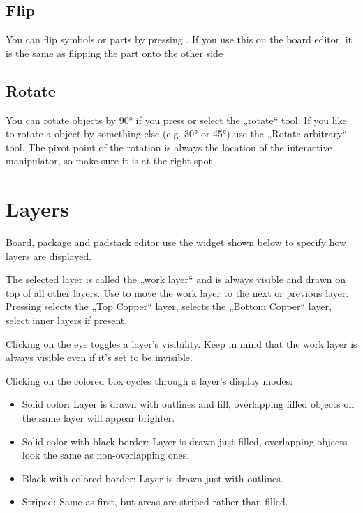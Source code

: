 \documentclass[letterpaper,10pt,czech]{sphinxmanual}
\begin{document}
\section{Flip}
\label{\detokenize{move:flip}}
You can flip symbols or parts by pressing . If you use this on the board editor, it is the same as flipping the part onto the other side


\section{Rotate}
\label{\detokenize{move:rotate}}
You can rotate objects by 90° if you press  or select the „rotate“ tool. If you like to rotate a object by something else (e.g. 30° or 45°) use the „Rotate arbitrary“ tool. The pivot point of the rotation is always the location of the interactive manipulator, so make sure it is at the right spot


\chapter{Layers}
\label{\detokenize{layers:layers}}\label{\detokenize{layers::doc}}
Board, package and padstack editor use the widget shown below to specify how layers are displayed.

\noindent{}

The selected layer is called the „work layer“ and is always visible and drawn on top of all other layers. Use  to move the work layer to the next or previous layer.
Pressing  selects the „Top Copper“ layer,  selects the „Bottom Copper“ layer,  select inner layers if present.

Clicking on the eye toggles a layer’s visibility. Keep in mind that the work layer is always visible even if it’s set to be invisible.

Clicking on the colored box cycles through a layer’s display modes:
\begin{itemize}
\item {} 
Solid color: Layer is drawn with outlines and fill, overlapping filled objects on the same layer will appear brighter.

\item {} 
Solid color with black border: Layer is drawn just filled, overlapping objects look the same as non-overlapping ones.

\item {} 
Black with colored border: Layer is drawn just with outlines.

\item {} 
Striped: Same as first, but areas are striped rather than filled.

\end{itemize}
\end{document}
